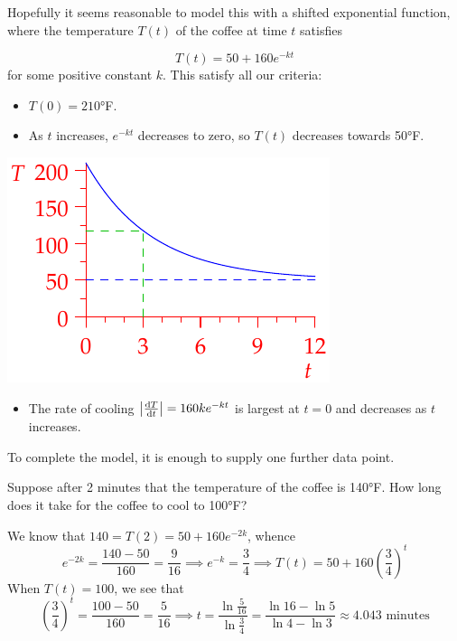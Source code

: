 Hopefully it seems reasonable to model this with a shifted exponential function, where  the temperature $T(t)$ of the coffee at time $t$ satisfies\par
\begin{minipage}[t]{0.6\linewidth}\vspace{-8pt}
\[T(t)=50+160e^{-kt}\]
for some positive constant $k$. This satisfy all our criteria:
\begin{itemize}%
  \item $T(0)=\ang{210}$F.
  \item As $t$ increases, $e^{-kt}$ decreases to zero, so $T(t)$ decreases towards \ang{50}F.
\end{itemize}
\end{minipage}\hfill\begin{minipage}[t]{0.39\linewidth}\vspace{-15pt}
\hfill\includegraphics{coffee}
\end{minipage}\par
\begin{itemize}
  \item The rate of cooling $\smash[t]{\nm{\diff[T]{t}}}=160ke^{-kt}$ is largest at $t=0$ and decreases as $t$ increases. 
\end{itemize}

To complete the model, it is enough to supply one further data point.\par

Suppose after 2 minutes that the temperature of the coffee is \ang{140}F. How long does it take for the coffee to cool to \ang{100}F?\smallbreak

We know that $140=T(2)=50+160e^{-2k}$, whence
\[e^{-2k}=\frac{140-50}{160}=\frac 9{16}\implies e^{-k}=\frac 34\implies T(t)=50+160\left(\frac 34\right)^t\]
When $T(t)=100$, we see that
\[\left(\frac 34\right)^t=\frac{100-50}{160}=\frac 5{16}\implies t=\frac{\ln\frac 5{16}}{\ln\frac 34} =\frac{\ln 16-\ln 5}{\ln 4-\ln 3}\approx 4.043\text{ minutes}\]


